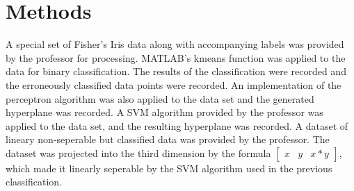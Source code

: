 \documentclass{article}
\begin{document}
	\section*{Methods}
	A special set of Fisher's Iris data along with accompanying labels was provided by the professor for processing. MATLAB's {\selectfont kmeans} function was applied to the data for binary classification. The results of the classification were recorded and the erroneously classified data points were recorded. An implementation of the perceptron algorithm was also applied to the data set and the generated hyperplane was recorded. A SVM algorithm provided by the professor was applied to the data set, and the resulting hyperplane was recorded. A dataset of lineary non-seperable but classified data was provided by the professor. The dataset was projected into the third dimension by the formula $\left[\begin{matrix}x & y & x*y\end{matrix}\right]$, which made it linearly seperable by the SVM algorithm used in the previous classification.
\end{document}
